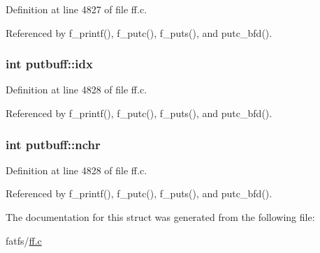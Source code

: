 Definition at line 4827 of file ff.\-c.



Referenced by f\-\_\-printf(), f\-\_\-putc(), f\-\_\-puts(), and putc\-\_\-bfd().

\hypertarget{structputbuff_a10a3ca93af8df07e9836ebd5230c06d8}{
\subsubsection[{idx}]{\setlength{\rightskip}{0pt plus 5cm}int putbuff\-::idx}}\label{structputbuff_a10a3ca93af8df07e9836ebd5230c06d8}


Definition at line 4828 of file ff.\-c.



Referenced by f\-\_\-printf(), f\-\_\-putc(), f\-\_\-puts(), and putc\-\_\-bfd().

\hypertarget{structputbuff_a125366bfe48077e6f562f95e30b4604a}{
\subsubsection[{nchr}]{\setlength{\rightskip}{0pt plus 5cm}int putbuff\-::nchr}}\label{structputbuff_a125366bfe48077e6f562f95e30b4604a}


Definition at line 4828 of file ff.\-c.



Referenced by f\-\_\-printf(), f\-\_\-putc(), f\-\_\-puts(), and putc\-\_\-bfd().



The documentation for this struct was generated from the following file\-:\begin{DoxyCompactItemize}
\item 
fatfs/\hyperlink{ff_8c}{ff.\-c}\end{DoxyCompactItemize}
